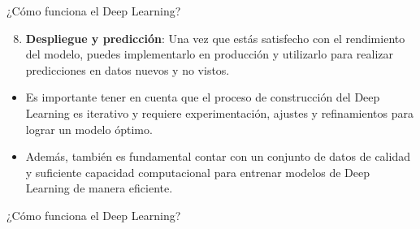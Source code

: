 \documentclass[11pt,aspectratio=169]{beamer}
\begin{document}
\begin{frame}{¿Cómo funciona el Deep Learning?}
	\begin{enumerate}
		\setcounter{enumi}{7}
		\item \textbf{Despliegue y predicción}: Una vez que estás satisfecho con el rendimiento del modelo, puedes implementarlo en producción y 
			utilizarlo para realizar predicciones en datos nuevos y no vistos.\pause
	\end{enumerate}
	\begin{itemize}
		\item Es importante tener en cuenta que el proceso de construcción del Deep Learning es iterativo y requiere experimentación, ajustes 
			y refinamientos para lograr un modelo óptimo. \pause
		\item Además, también es fundamental contar con un conjunto de datos de calidad y suficiente capacidad computacional para entrenar 
			modelos de Deep Learning de manera eficiente.
	\end{itemize}
\end{frame}

\begin{frame}{¿Cómo funciona el Deep Learning?}
	
\end{frame}
\end{document}
